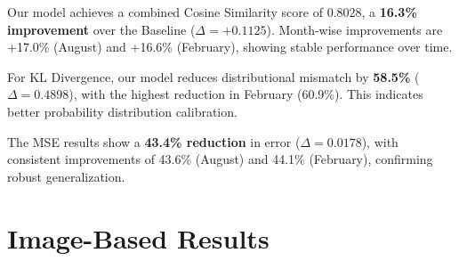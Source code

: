 \begin{table}[h]
    \centering
    \caption{Performance comparison between Baseline and Our Model. The Baseline is the \textbf{CardiffNLP RoBERTa-Large}, which is used in a zero-shot setting. Higher values are better for $\uparrow$, and lower values are better for $\downarrow$. Bold values indicate combined scores.}
    \label{tab:comparison}
\end{table}

Our model achieves a combined Cosine Similarity score of 0.8028, a \textbf{16.3\% improvement} over the Baseline ($\Delta = +0.1125$). Month-wise improvements are +17.0\% (August) and +16.6\% (February), showing stable performance over time.
\newline

For KL Divergence, our model reduces distributional mismatch by \textbf{58.5\%} ($\Delta = 0.4898$), with the highest reduction in February (60.9\%). This indicates better probability distribution calibration.
\newline

The MSE results show a \textbf{43.4\% reduction} in error ($\Delta = 0.0178$), with consistent improvements of 43.6\% (August) and 44.1\% (February), confirming robust generalization.

\section{Image-Based Results}
\label{sec:image-results}

